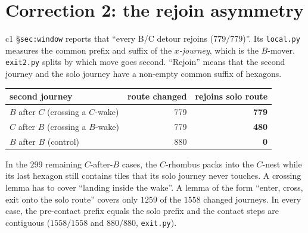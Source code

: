 \documentclass[11pt]{article}
\theoremstyle{definition}
\begin{document}
\section{Correction 2: the rejoin asymmetry}\label{sec:rejoin}
c1 \S\texttt{sec:window} reports that ``every B/C detour rejoins ($779/779$)''. Its \texttt{local.py} measures the common prefix and
suffix of the \emph{$x$-journey}, which is the $B$-mover. \texttt{exit2.py} splits by which move goes second. ``Rejoin'' means that
the second journey and the solo journey have a non-empty common suffix of hexagons.
\begin{center}\begin{tabular}{lrr}\toprule
second journey & route changed & rejoins solo route\\\midrule
$B$ after $C$ (crossing a $C$-wake) & 779 & \textbf{779}\\
$C$ after $B$ (crossing a $B$-wake) & 779 & \textbf{480}\\
$B$ after $B$ (control) & 880 & \textbf{0}\\\bottomrule
\end{tabular}\end{center}
In the $299$ remaining $C$-after-$B$ cases, the $C$-rhombus packs into the $C$-nest while its last hexagon still contains tiles that
its solo journey never touches. A crossing lemma has to cover
``landing inside the wake''. A lemma of the form ``enter, cross, exit onto the solo route'' covers only $1259$ of the $1558$ changed
journeys. In every case, the pre-contact prefix equals the solo prefix and the contact steps are contiguous ($1558/1558$ and
$880/880$, \texttt{exit.py}).
\end{document}
